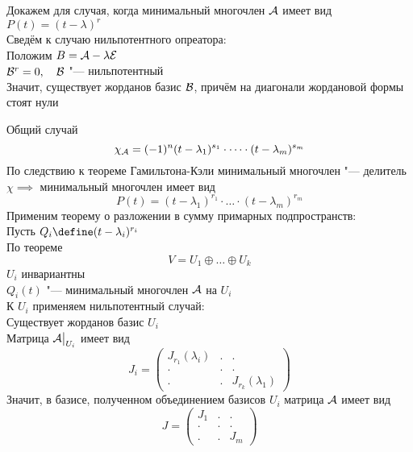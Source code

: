 \begin{iproof}
	\item Докажем для случая, когда минимальный многочлен $ \mathcal{A} $ имеет вид $ P(t) = (t - \lambda)^r $ \\
	Сведём к случаю нильпотентного опреатора: \\
	Положим $ B = \mathcal{A} - \lambda\mathcal{E} $ \\
	$ \mathcal{B}^r = 0, \quad \mathcal{B} $ "--- нильпотентный \\
	Значит, существует жорданов базис $ \mathcal{B} $, причём на диагонали жордановой формы стоят нули
	\item Общий случай
	$$ \chi_{\mathcal{A}} = (-1)^n(t - \lambda_1)^{s_1} \cdot \dots \cdot (t - \lambda_m)^{s_m} $$
	По следствию к теореме Гамильтона-Кэли минимальный многочлен "--- делитель $ \chi \implies $ минимальный многочлен имеет вид
	$$ P(t) = (t - \lambda_1)^{r_1} \cdot \dots \cdot (t - \lambda_m)^{r_m} $$
	Применим теорему о разложении в сумму примарных подпространств: \\
	Пусть $ Q_i \define (t - \lambda_i)^{r_i} $ \\
	По теореме
	$$ V = U_1 \oplus \dots \oplus U_k $$
	$ U_i $ инвариантны \\
	$ Q_i(t) $ "--- минимальный многочлен $ \mathcal{A} $ на $ U_i $ \\
	К $ U_i $ применяем нильпотентный случай: \\
	Существует жорданов базис $ U_i $ \\
	Матрица $ \mathcal{A}\big|_{U_i}^{} $ имеет вид
	$$ J_i =
	\begin{pmatrix}
		J_{r_1}(\lambda_i) & . & . \\
		. & . & . \\
		. & . & J_{r_k}(\lambda_1)
	\end{pmatrix} $$
	Значит, в базисе, полученном объединением базисов $ U_i $ матрица $ \mathcal{A} $ имеет вид
	$$ J =
	\begin{pmatrix}
		J_1 & . & . \\
		. & . & . \\
		. & . & J_m
	\end{pmatrix} $$
\end{iproof}

